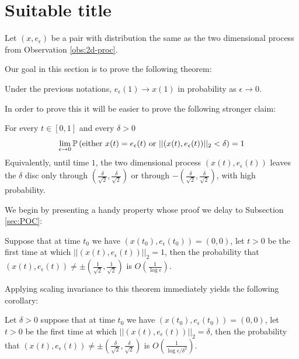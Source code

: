 {
\newcommand{\eeps}{e_\epsilon}


\section{Suitable title}
Let $(x, \eeps)$ be a pair with distribution the same as the two
dimensional process from Observation \ref{obs:2d-proc}.

Our goal in this section is to prove the following theorem:
\begin{theorem}\label{thm:main1}
Under the previous notations, $\eeps(1) \to x(1)$ in probability
as $\epsilon \to 0$.
\end{theorem}

\newcommand{\radiussq}{\delta^2}
\newcommand{\radius}{\delta}
\newcommand{\twonorm}[1]{||#1||_2}

\newcommand{\twodproc}[1]{(x(#1), \eeps(#1))}

In order to prove this it will be easier to prove the following
stronger claim:
\begin{propos}\label{thm:main2}
For every $t\in[0,1]$ and every $\radius>0$
$$\ds \lim_{\epsilon \rightarrow 0}\P\left(\text{either } x(t)=\eeps(t)
\text{ or } \twonorm{\twodproc{t}} <\radius\right)=1$$
Equivalently, until time $1$, the two dimensional process $\twodproc{t}$
leaves the $\radius$ disc only through $(\frac{\radius}{\sqrt2},\frac{\radius}{\sqrt2})$ or through $-(\frac{\radius}{\sqrt2},\frac{\radius}{\sqrt2})$, with high probability.
\end{propos}

We begin by presenting a handy property whose proof
we delay to Subsection \ref{sec:POC}:

\begin{propos}\label{thm:no-escape}
Suppose that at time $t_0$ we have
$\twodproc{t_0}=(0,0)$, let $t>0$ be the first time at which
$\twonorm{\twodproc{t}}=1$, then the probability
that $\twodproc{t} \not=\pm(\frac{1}{\sqrt2},\frac{1}{\sqrt2})$ is $O(\frac1{\log\epsilon})$.
\end{propos}

Applying scaling invariance to this theorem immediately yields the
following corollary:
\begin{cor}\label{cor:cor1}
Let $\radius>0$ suppose that at time $t_0$ we have $\twodproc{t_0}=(0,0)$, let
$t>0$ be the first time at which
$\twonorm{\twodproc{t}} = \radius$, then the probability
that $\twodproc{t} \not=\pm(\frac{\radius}{\sqrt2},\frac{\radius}{\sqrt2})$ is
$O(\frac{1}{\log\epsilon/\radiussq})$.
\end{cor}

}
